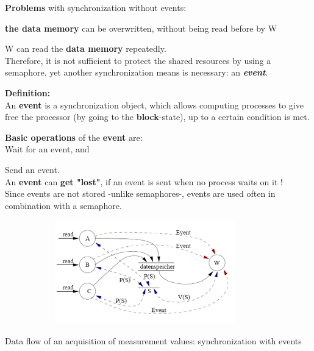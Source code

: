 \textbf{Problems} with synchronization without events:

\hspace{1cm} \textbf{the data memory} can be overwritten, without being read before by W
 
\hspace{1cm} W can read the \textbf{data memory} repeatedly.\\

Therefore, it is not sufficient to protect the shared resources by using a semaphore, yet another synchronization means is necessary: an \textbf{\textit{event}}.

\begin{tcolorbox}[colback=blue!5!white,colframe=blue!75!black]
 \textbf{Definition: }\\ An \textbf{event} is a synchronization object, which allows computing processes to give free the processor (by going to the \textbf{block}-state), up to a certain condition is met.
\end{tcolorbox}

\textbf{Basic operations} of the \textbf{event} are:\\

\hspace{1cm}  Wait for an event, and

\hspace{1cm}  Send an event.\\

An \textbf{event} can\textbf{ get "lost"}, if an event is sent when no process waits on it  !\\
Since events are not stored -unlike semaphores-, events are used often in combination with a semaphore.

 	\begin{figure}[h]
    \centering
    \includegraphics[width=10cm, height=4.5cm]{Images/image18.png}
    \label{fig:Fig }
    \end{figure}

Data flow of an acquisition of measurement values: synchronization with events

